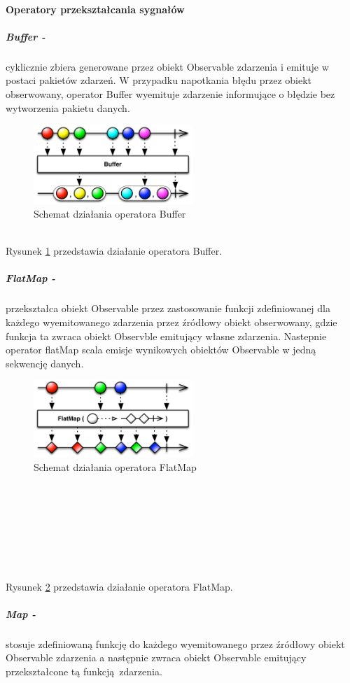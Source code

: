 \documentclass[12pt,oneside,a4paper]{report}
\begin{document}
\paragraph{Operatory przekształcania sygnałów}
\subparagraph{Buffer -}cyklicznie zbiera generowane przez obiekt Observable zdarzenia i emituje w postaci pakietów zdarzeń. W przypadku napotkania błędu przez obiekt obserwowany, operator Buffer wyemituje zdarzenie informujące o błędzie bez wytworzenia pakietu danych.
\begin{figure}[ht!]
	\centering
	\includegraphics[width=6cm]{buffer}
	\caption{Schemat działania operatora Buffer\cite{buffer}}
	\label{buffer}
\end{figure}\\
Rysunek \ref{buffer} przedstawia działanie operatora Buffer.
\subparagraph{FlatMap -}przekształca obiekt Observable przez zastosowanie funkcji zdefiniowanej dla każdego wyemitowanego zdarzenia przez źródłowy obiekt obserwowany, gdzie funkcja ta zwraca obiekt Observble emitujący własne zdarzenia. Nastepnie operator flatMap scala emisje wynikowych obiektów Observable w jedną sekwencję danych.
\begin{figure}[ht!]
	\centering
	\includegraphics[width=6cm]{flatmap}
	\caption{Schemat działania operatora FlatMap\cite{operators}}
	\label{flatmap}
\end{figure}\\\\\\\\\\\\\\
Rysunek \ref{flatmap} przedstawia działanie operatora FlatMap.
\subparagraph{Map -}stosuje zdefiniowaną funkcję do każdego wyemitowanego przez źródłowy obiekt Observable zdarzenia a następnie zwraca obiekt Observable emitujący przekształcone tą funkcją zdarzenia.
\end{document}
